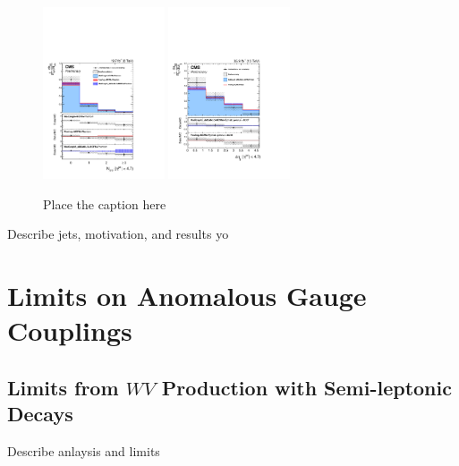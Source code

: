 \documentclass[10pt]{article}
\begin{document}
\begin{figure}[htb]
  \centering
    \includegraphics[height=2in]{figures/ZZ_8TeV_nJets_unfolded.pdf}
    \includegraphics[height=2in]{figures/ZZ_13TeV_dEtajj_unfolded.pdf}
  \caption{ Place the caption here}
  \label{fig:ZZjets}
\end{figure}
\cite{CMS:2017ruh}
\cite{CMS-PAS-SMP-16-019}

Describe jets, motivation, and results yo

\section{Limits on Anomalous Gauge Couplings}

\subsection{Limits from $WV$ Production with Semi-leptonic Decays}

Describe anlaysis and limits

\cite{CMS:2017ruh}
\cite{Sirunyan:2017bey}
\end{document}
